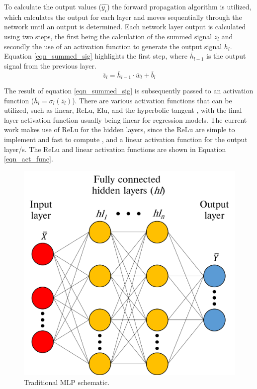 \documentclass[a4paper,fleqn]{cas-sc}
\begin{document}
To calculate the output values ($\hat{y_i}$) the forward propagation algorithm is utilized, which calculates the output for each layer and moves sequentially through the network until an output is determined. Each network layer output is calculated using two steps, the first being the calculation of the summed signal $\overline{z}_l$ and secondly the use of an activation function to generate the output signal $\overline{h}_l$. Equation \ref{eqn_summed_sig} highlights the first step, where $\overline{h}_{l-1}$ is the output signal from the previous layer.
\begin{equation}\label{eqn_summed_sig}
\overline{z}_l = \overline{h}_{l-1}\cdot\overline{w}_l+\overline{b}_l
\end{equation}

The result of equation \ref{eqn_summed_sig} is subsequently passed to an activation function ($\overline{h}_l = \sigma_l(\overline{z}_l)$). There are various activation functions that can be utilized, such as linear, ReLu, Elu, and the hyperbolic tangent \citep{goodfellow}, with the final layer activation function usually being linear for regression models. The current work makes use of ReLu for the hidden layers, since the ReLu are simple to implement and fast to compute \cite{Wheeler2019}, and a linear activation function for the output layer/s. The ReLu and linear activation functions are shown in Equation \ref{eqn_act_func}.
\begin{figure}[h!]
	\centering
		\includegraphics[scale=0.5]{ML_SCHEMATIC}
	  \caption{Traditional MLP schematic.}\label{fig_mlp_schematic}
\end{figure}
\end{document}
